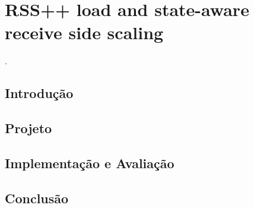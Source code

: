 
\chapter{RSS++ load and state-aware receive side scaling}
 \cite{barbette2019rss}.


\section*{Introdução}




\section*{Projeto}




\section*{Implementação e Avaliação}




\section*{Conclusão}


